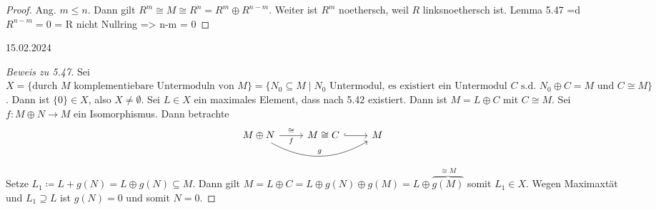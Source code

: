 \documentclass[../main.tex]{subfiles}
\begin{document}
\begin{proof}
    Ang. $m\leq n$. Dann gilt $R^m\cong M\cong R^n = R^m \oplus R^{n-m}$. Weiter ist $R^m$ noethersch, weil $R$ linksnoethersch ist.
    Lemma 5.47 =d $R^{n-m} = 0$  = R nicht Nullring => n-m = 0 
\end{proof}

\begin{flushright}
    15.02.2024
\end{flushright}

\begin{proof}[Beweis zu 5.47]
    Sei $X=\{\text{durch $M$ komplementiebare Untermoduln von $M$}\} = \{N_0\subseteq M\mid\text{$N_0$ Untermodul, es existiert ein Untermodul $C$ s.d. $N_0\oplus C = M$ und $C\cong M$} \}$.
     Dann ist $\{0\}\in X$, also $X\neq \emptyset$. Sei $L\in X$ ein maximales Element, dass nach 5.42 existiert.
     Dann ist $M=L\oplus C$ mit $C\cong M$.
     Sei $f:M\oplus N\rightarrow M$ ein Isomorphismus.
     Dann betrachte 
     $$%
    \begin{tikzcd}
    M\oplus N \arrow[r, "\cong", "f"'] \arrow[rr, "g", bend right] & M\cong C \arrow[r, hook] & M
    \end{tikzcd}$$
    Setze $L_1\coloneqq L + g(N) = L\oplus g(N)\subseteq M$.
    Dann gilt $M=L\oplus C = L\oplus g(N)\oplus g(M) = L\oplus \overbrace{g(M)}^{\cong M}$ somit $L_1\in X$.
    Wegen Maximaxtät und $L_1\supseteq L$ ist $g(N) = 0$ und somit $N=0$.
\end{proof}
\end{document}
